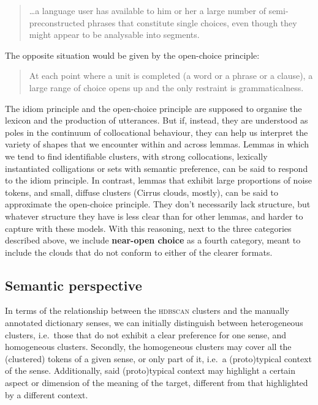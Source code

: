 \documentclass[
]{book}
\begin{document}
\begin{quote}
\ldots a language user has available to him or her a large number of semi-preconstructed phrases that constitute single choices, even though they might appear to be analysable into segments. \autocite[110]{sinclair_1991}
\end{quote}

The opposite situation would be given by the open-choice principle:

\begin{quote}
At each point where a unit is completed (a word or a phrase or a clause), a large range of choice opens up and the only restraint is grammaticalness. \autocite[109]{sinclair_1991}
\end{quote}

The idiom principle and the open-choice principle are supposed to organise the lexicon and the production of utterances. But if, instead, they are understood as poles in the continuum of collocational behaviour, they can help us interpret the variety of shapes that we encounter within and across lemmas. Lemmas in which we tend to find identifiable clusters, with strong collocations, lexically instantiated colligations or sets with semantic preference, can be said to respond to the idiom principle. In contrast, lemmas that exhibit large proportions of noise tokens, and small, diffuse clusters (Cirrus clouds, mostly), can be said to approximate the open-choice principle. They don't necessarily lack structure, but whatever structure they have is less clear than for other lemmas, and harder to capture with these models.
With this reasoning, next to the three categories described above, we include \textbf{near-open choice} as a fourth category, meant to include the clouds that do not conform to either of the clearer formats.

\hypertarget{semantically}{%
\subsection{Semantic perspective}\label{semantically}}

In terms of the relationship between the \textsc{hdbscan} clusters and the manually annotated dictionary senses, we can initially distinguish between heterogeneous clusters, i.e.~those that do not exhibit a clear preference for one sense, and homogeneous clusters. Secondly, the homogeneous clusters may cover all the (clustered) tokens of a given sense, or only part of it, i.e.~a (proto)typical context of the sense. Additionally, said (proto)typical context may highlight a certain aspect or dimension of the meaning of the target, different from that highlighted by a different context.
\end{document}
